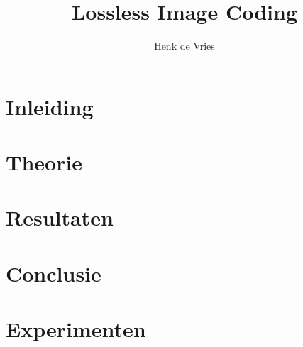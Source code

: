 \documentclass{uvamath}
\title{Lossless Image Coding}
\author[henk@science.uva.nl, 6127901]{Henk de Vries}
\begin{document}
\maketitle

\begin{abstract}
\lipsum[2-3] %
\end{abstract}

\tableofcontents

\chapter{Inleiding}
\lipsum

\chapter{Theorie}
\lipsum[2] 

\chapter{Resultaten}
\lipsum[2]

\chapter{Conclusie}
\lipsum[1]

\appendix

\chapter{Experimenten}
\lipsum[2]
\end{document}
